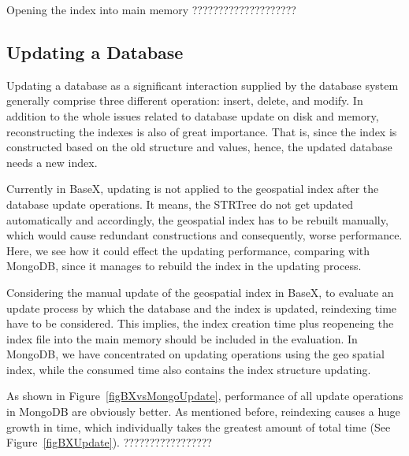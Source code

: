 \documentclass[a4paper,12pt]{article}
\begin{document}
Opening the index into main memory ????????????????????


\subsection{Updating a Database}

Updating a database as a significant interaction supplied by the database system generally comprise three different operation: insert, delete, and modify. In addition to the whole issues related to database update on disk and memory, reconstructing the indexes is also of great importance. That is, since the index is constructed based on the old structure and values, hence, the updated database needs a new index. 

Currently in BaseX, updating is not applied to the geospatial index after the database update operations. It means, the STRTree do not get updated automatically and accordingly, the geospatial index has to be rebuilt manually, which would cause redundant constructions and consequently, worse performance. Here, we see how it could effect the updating performance, comparing with MongoDB, since it manages to rebuild the index in the updating process.

Considering the manual update of the geospatial index in BaseX, to evaluate an update process by which the database and the index is updated, reindexing time have to be considered. This implies, the index creation time plus reopeneing the index file into the main memory should be included in the evaluation. In MongoDB, we have concentrated on updating operations using the geo spatial index, while the consumed time also contains the index structure updating. 


As shown in Figure~\ref{figBXvsMongoUpdate}, performance of all update operations in MongoDB are obviously better. As mentioned before, reindexing causes a huge growth in time, which individually takes the greatest amount of total time (See Figure~\ref{figBXUpdate}).  ?????????????????
 
\end{document}
